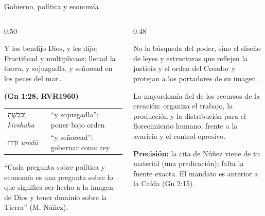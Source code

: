 \documentclass[hyperref={bookmarks=false},aspectratio=169]{beamer}
\newcommand{\heb}[1]{\mbox{\foreignlanguage{hebrew}{#1}}}
\newcommand{\fuente}[1]{\par\hfill{\upshape\bfseries\footnotesize\textcolor{azul}{#1}}}
\newcommand{\precision}[1]{{\footnotesize\color{gris}\textbf{Precisión:} #1}}
\begin{document}
\begin{frame}{Gobierno, política y economía}
\begin{columns}[t,onlytextwidth]
\begin{column}{0.50\textwidth}
\begin{cita}Y los bendijo Dios, y les dijo: Fructificad y multiplicaos; llenad la tierra, y sojuzgadla, y señoread en los peces del mar\ldots\fuente{(Gn 1:28, RVR1960)}\end{cita}
\scriptsize\renewcommand{\arraystretch}{1.12}
\begin{tabular}{@{}>{\RaggedRight\arraybackslash}p{1.9cm}>{\RaggedRight\arraybackslash}p{4.0cm}@{}}
\toprule
\heb{וְכִבְשֻׁהָ} \emph{kivshuha} & ``y sojuzgadla'': poner bajo orden \\
\heb{וּרְדוּ} \emph{uredú} & ``y señoread'': gobernar como rey \\
\bottomrule
\end{tabular}\par\smallskip
``Cada pregunta sobre política y economía es una pregunta sobre lo que significa ser hecho a la imagen de Dios y tener dominio sobre la Tierra'' (M. Núñez).
\end{column}
\begin{column}{0.48\textwidth}
\begin{tcolorbox}[colback=papiro,colframe=azul,boxrule=0.8pt,arc=3pt,fonttitle=\bfseries\scriptsize,title=Ciencias políticas]
\scriptsize No la búsqueda del poder, sino el diseño de leyes y estructuras que reflejen la justicia y el orden del Creador y protejan a los portadores de su imagen.
\end{tcolorbox}
\begin{tcolorbox}[colback=papiro,colframe=azul,boxrule=0.8pt,arc=3pt,fonttitle=\bfseries\scriptsize,title=Economía]
\scriptsize La mayordomía fiel de los recursos de la creación: organiza el trabajo, la producción y la distribución para el florecimiento humano, frente a la avaricia y el control opresivo.
\end{tcolorbox}
\precision{la cita de Núñez viene de tu material (una predicación); falta la fuente exacta. El mandato es anterior a la Caída (Gn 2:15).}
\end{column}
\end{columns}
\end{frame}
\end{document}
